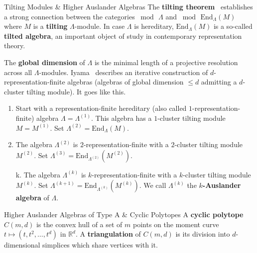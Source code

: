 \documentclass[final]{beamer}
\newlength{\colwidth}
\begin{document}
\begin{frame}[t]
\begin{columns}[t]
\begin{column}{\colwidth}
\begin{block}{Tilting Modules \& Higher Auslander Algebras}
    The \textbf{tilting theorem}~\cite[Theorem 3.8, Chapter VI]{modraknizka}
    establishes a strong connection between the categories $\bmod \, \Lambda$
    and $\bmod \, \mathrm{End}_{\Lambda}(M)$ where $M$ is a \textbf{tilting}
    $\Lambda$-module. In case $\Lambda$ is hereditary,
    $\mathrm{End}_{\Lambda}(M)$ is a so-called \textbf{tilted algebra}, an
    important object of study in contemporary representation theory.

    The \textbf{global dimension} of $\Lambda$ is the minimal length of a
    projective resolution across all $\Lambda$-modules. Iyama~\cite{iyama}
    describes an iterative construction of $d$-representation-finite algebras
    (algebras of global dimension $ \leq d$ admitting a $d$-cluster tilting
    module). It goes like this.
    \begin{enumerate}
     \item Start with a representation-finite hereditary (also called
       $1$-representation-finite) algebra $\Lambda = \Lambda^{(1)}$. This
       algebra has a $1$-cluster tilting module $M = M^{(1)}$. Set
       $\Lambda^{(2)} = \mathrm{End}_{\Lambda}(M)$.
     \item The algebra $\Lambda^{(2)}$ is $2$-representation-finite with a
       $2$-cluster tilting module $M^{(2)}$. Set $\Lambda^{(3)} =
       \mathrm{End}_{\Lambda^{(2)}}(M^{(2)})$.
     \item[k.] The algebra $\Lambda^{(k)}$ is $k$-representation-finite with a
       $k$-cluster tilting module $M^{(k)}$. Set $\Lambda^{(k + 1)} =
       \mathrm{End}_{\Lambda^{(k)}}(M^{(k)})$. We call $\Lambda^{(k)}$ the
       \textbf{$k$-Auslander algebra} of $\Lambda$.
   \end{enumerate}
  \end{block}

  \begin{exampleblock}{Higher Auslander Algebras of Type A \& Cyclic Polytopes}
    A \textbf{cyclic polytope} $C(m,d)$ is the convex hull of a set of $m$
    points on the moment curve $t \mapsto (t, t^2, \ldots, t^{d})$ in
    $\mathbb{R}^{d}$. A \textbf{triangulation} of $C(m,d)$ is its division into
    $d$-dimensional simplices which share vertices with it.


\end{exampleblock}
\end{column}
\end{columns}
\end{frame}
\end{document}
